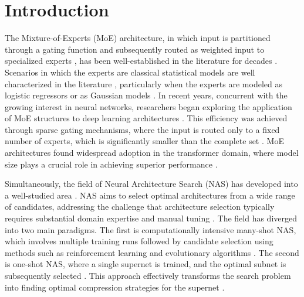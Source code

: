 \section{Introduction}
\label{sec:introduction}


The Mixture-of-Experts (MoE) architecture, in which input is partitioned through a gating function and subsequently routed as weighted input to specialized experts \cite{jacobs1991adaptive, jordan1994hierarchical, jacobs1997bayesian}, has been well-established in the literature for decades \cite{mu2025comprehensive}.
Scenarios in which the experts are classical statistical models are well characterized in the literature \cite{piwko2025divide}, particularly when the experts are modeled as logistic regressors \citep{nguyen2023general} or as Gaussian models \citep{nguyen2023demystifying, rasmussen2001infinite}.
In recent years, concurrent with the growing interest in neural networks, researchers began exploring the application of MoE structures to deep learning architectures \cite{eigen2013learning}.
This efficiency was achieved through sparse gating mechanisms, where the input is routed only to a fixed number of experts, which is significantly smaller than the complete set \cite{shazeer2017outrageously, riquelme2021scaling, fedus2022switch}.
MoE architectures found widespread adoption in the transformer domain, where model size plays a crucial role in achieving superior performance \cite{jiang2024mixtral, qiu2025demons, dai2024deepseekmoe}.

Simultaneously, the field of Neural Architecture Search (NAS) has developed into a well-studied area \cite{ren2021comprehensive, nayman2019xnas, zoph2018learning}.
NAS aims to select optimal architectures from a wide range of candidates, addressing the challenge that architecture selection typically requires substantial domain expertise and manual tuning \cite{liu2018darts, ren2021comprehensive}.
The field has diverged into two main paradigms.
The first is computationally intensive many-shot NAS, which involves multiple training runs followed by candidate selection using methods such as reinforcement learning \cite{zoph2016neural, baker2016designing} and evolutionary algorithms \cite{real2019regularized, yang2020cars}.
The second is one-shot NAS, where a single supernet is trained, and the optimal subnet is subsequently selected \cite{liu2018darts, chen2020stabilizing, you2020greedynas}.
This approach effectively transforms the search problem into finding optimal compression strategies for the supernet \cite{liu2018darts}.

